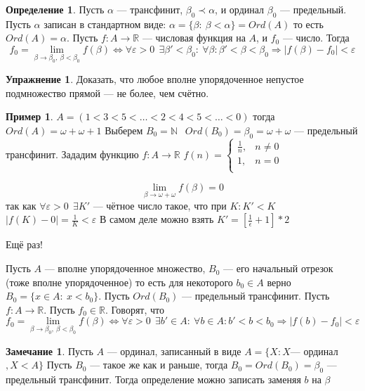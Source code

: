 \documentclass[12pt,oneside]{article}
\theoremstyle{definition}
\newtheorem{definition}{Определение}
\newtheorem{exercise}{Упражнение}
\newtheorem{exmp}{Пример}[section]
\newtheorem{remark}{Замечание}[section]
\begin{document}
\begin{definition}
Пусть $\alpha$ --- трансфинит, $\beta_0 \prec \alpha$, и ординал $\beta_0$ --- предельный. Пусть $\alpha$ записан в стандартном виде: $\alpha = \{\beta :\ \beta < \alpha\} =Ord(A)$ то есть $Ord(A)=\alpha$. Пусть $f : A \longrightarrow \mathbb{R}$ --- числовая функция на $A$, и $f_0$ --- число. Тогда 
$$f_0 = \lim_{\beta \rightarrow\beta_0,\ \beta < \beta_0}f(\beta) \Longleftrightarrow \forall \varepsilon > 0\ \ \exists \beta' < \beta_0:\ \forall\beta: \beta' < \beta < \beta_0 \Longrightarrow |f(\beta) - f_0| <  \varepsilon $$
\begin{exercise}
Доказать, что любое вполне упорядоченное непустое подмножество прямой --- не более, чем счётно.
\end{exercise}
\end{definition}

\begin{exmp}
$A = (1<3<5<\dots<2<4<5<\dots<0)$ тогда $Ord(A) = \omega + \omega + 1$
Выберем $B_0 = \mathbb{N}\ $ $\ Ord(B_0) = \beta_0 =\omega + \omega $ --- предельный трансфинит. Зададим функцию $f : A \longrightarrow \mathbb{R}$
$f(n)  = \begin{cases}
\frac{1}{n}, & n \neq 0 \\
1, & n = 0\\
\end{cases}$

$$ \lim_{\beta \rightarrow \omega + \omega }f(\beta) = 0$$ так как $\forall \varepsilon > 0\ \ \exists K'$ --- чётное число такое, что при $K : K' < K$ 
\newline
$|f(K) - 0| = \frac{1}{K} < \varepsilon$
В самом деле можно взять $K' = [\frac{1}{\epsilon} + 1]*2$

Ещё раз!

Пусть $A$ --- вполне упорядоченное множество, $B_0$ --- его начальный отрезок (тоже вполне упорядоченное) то есть для некоторого $b_0\in A$ верно $B_0 = \{x\in A:\ x<b_0\}$. Пусть $Ord(B_0)$ --- предельный трансфинит. Пусть $f : A \rightarrow \mathbb{R}$. Пусть $f_0\in \mathbb{R}$. Говорят, что 
$$ f_0 = \lim_{\beta \rightarrow\beta_0,\ \beta < \beta_0}f(\beta) \Longleftrightarrow \forall \varepsilon > 0\ \ \exists b' \in A:\ \forall b\in A: b' < b < b_0 \Longrightarrow |f(b) - f_0| <  \varepsilon $$

\end{exmp}

\begin{remark}
Пусть $A$ --- ординал, записанный в виде $ A = \{X:  X$--- ординал$, X<A\}$ Пусть $B_0$ --- такое же как и раньше, тогда $B_0 = Ord(B_0) = \beta_0 $ --- предельный трансфинит. Тогда определение можно записать заменяя $b$ на  $\beta$
\end{remark}
\end{document}
